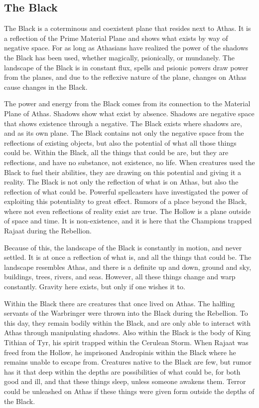 \subsection{The Black}
The Black is a coterminous and coexistent plane that resides next to Athas. It is a reflection of the Prime Material Plane and shows what exists by way of negative space. For as long as Athasians have realized the power of the shadows the Black has been used, whether magically, psionically, or mundanely. The landscape of the Black is in constant flux, spells and psionic powers draw power from the planes, and due to the reflexive nature of the plane, changes on Athas cause changes in the Black.

The power and energy from the Black comes from its connection to the Material Plane of Athas. Shadows show what exist by absence. Shadows are negative space that shows existence through a negative. The Black exists where shadows are, and as its own plane. The Black contains not only the negative space from the reflections of existing objects, but also the potential of what all those things could be. Within the Black, all the things that could be are, but they are reflections, and have no substance, not existence, no life. When creatures used the Black to fuel their abilities, they are drawing on this potential and giving it a reality. The Black is not only the reflection of what is on Athas, but also the reflection of what could be. Powerful spellcasters have investigated the power of exploiting this potentiality to great effect. Rumors of a place beyond the Black, where not even reflections of reality exist are true. The Hollow is a plane outside of space and time. It is non-existence, and it is here that the Champions trapped Rajaat during the Rebellion.

Because of this, the landscape of the Black is constantly in motion, and never settled. It is at once a reflection of what is, and all the things that could be. The landscape resembles Athas, and there is a definite up and down, ground and sky, buildings, trees, rivers, and seas. However, all these things change and warp constantly. Gravity here exists, but only if one wishes it to.

Within the Black there are creatures that once lived on Athas. The halfling servants of the Warbringer were thrown into the Black during the Rebellion. To this day, they remain bodily within the Black, and are only able to interact with Athas through manipulating shadows. Also within the Black is the body of King Tithian of Tyr, his spirit trapped within the Cerulean Storm. When Rajaat was freed from the Hollow, he imprisoned Andropinis within the Black where he remains unable to escape from. Creatures native to the Black are few, but rumor has it that deep within the depths are possibilities of what could be, for both good and ill, and that these things sleep, unless someone awakens them. Terror could be unleashed on Athas if these things were given form outside the depths of the Black.

